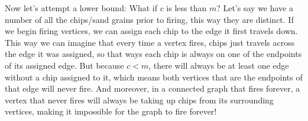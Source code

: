 \documentclass{article}
\begin{document}
Now let's attempt a lower bound: What if $c$ is less than $m$? Let's say we have a number of all the chips/sand grains prior to firing, this way they are distinct. If we begin firing vertices, we can assign each chip to the edge it first travels down. This way we can imagine that every time a vertex fires, chips just travels across the edge it was assigned, so that ways each chip is always on one of the endpoints of its assigned edge. But because $c<m$, there will always be at least one edge without a chip assigned to it, which means both vertices that are the endpoints of that edge will never fire. And moreover, in a connected graph that fires forever, a vertex that never fires will always be taking up chips from its surrounding vertices, making it impossible for the graph to fire forever! \\
\end{document}

